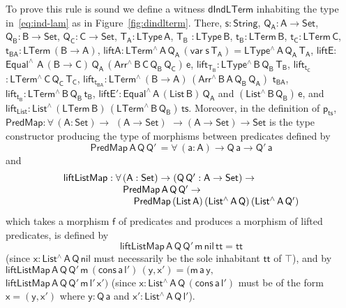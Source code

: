 \documentclass[sigplan,10pt,anonymous,review]{acmart}
\begin{document}
To prove this rule is sound we define a witness $\mathsf{dIndLTerm}$
inhabiting the type in~\eqref{eq:ind-lam} as in
Figure~\ref{fig:dindlterm}. There, $\mathsf{s : String}$, $\mathsf{Q_A
  : A \to Set}$, $\mathsf{Q_B : B \to Set}$, $\mathsf{Q_C : C \to
  Set}$, $\mathsf{T_A : LType\,A}$, $\mathsf{T_B}$ $\mathsf{:
  LType\,B}$, $\mathsf{t_B : LTerm\,B}$, $\mathsf{t_C : LTerm\,C}$,
$\mathsf{t_{BA} : LTerm\,(B \to A)}$, $\mathsf{liftA :
  LTerm^{\wedge}\, A\, Q_A\, (var\;s\,T_A) =
  LType^{\wedge}\,A\,Q_A\,T_A}$, $\mathsf{liftE :}$
$\mathsf{Equal^{\wedge}}$ $\mathsf{A\, (B \to C)\, Q_A\, (Arr^{\wedge}
  \, B\, C\, Q_B \, Q_C) \, e}$, $\mathsf{lift_{T_B}: LType^{\wedge}
  \, B\, Q_B\, T_B}$, $\mathsf{lift_{t_C}}$ $\mathsf{: LTerm^{\wedge}
  \, C\, Q_C\, T_C}$, $\mathsf{lift_{t_{BA}}: LTerm^{\wedge} \, (B \to
  A)\, (Arr^{\wedge} \, B\, A\, Q_B \, Q_A)}$ $\mathsf{t_{BA}}$,
$\mathsf{lift_{t_B}: LTerm^{\wedge} \, B\, Q_B\, t_B}$,
$\mathsf{liftE' : Equal^{\wedge}\, A\, (List\,B)\, Q_A}$ and
$\mathsf{(List^{\wedge}\, B\, Q_B)\, e}$, and $\mathsf{lift_{List}:
  List^{\wedge} \, (LTerm\, B) \, (LTerm^{\wedge}\, B\, Q_B) \, ts}$.
Moreover, in the definition of $\mathsf{p_{ts}}$, $\mathsf{PredMap :
  \forall\, (A : Set) \to}$ $\mathsf{(A \to Set)}$ $\mathsf{\to (A \to
  Set) \to Set }$ is the type constructor producing the type of
morphisms between predicates defined by
\[\mathsf{PredMap \,A\, Q\,Q'\,
  = \forall\, (a : A) \to Q\,a \to Q'\,a}\] and
\[\begin{array}{l}
\mathsf{liftListMap : \forall\, (A : Set) \to (Q \, Q' : A \to Set)
  \to}\\\
\hspace*{0.8in}\mathsf{PredMap\,A\,Q\,Q' \to}\\
\hspace*{1in}\mathsf{PredMap\,(List\,A)
  \,(List^{\wedge}\, A\, Q)\, (List^{\wedge}\, A\, Q')}
\end{array}\]
which takes a morphism $\mathsf{f}$ of predicates and produces a
morphism of lifted predicates, is defined by
\[\mathsf{liftListMap\, A\, Q\, Q'\, m\, nil\, tt = tt}\]
(since $\mathsf{x : List^{\wedge}\,
  A\, Q\, nil}$ must necessarily be the sole inhabitant $\mathsf{tt}$
of $\mathsf{\top}$), and by $\mathsf{liftListMap\, A\, Q\, Q'\, m\,
  (cons\, a\, l')\, (y, x') = (m\,a\,y,}$\\ $\mathsf{liftListMap\, A\,
  Q\, Q'\, m\, l'\, x')}$ (since $\mathsf{x : List^{\wedge}\, A\,
  Q\, (cons\, a\, l')}$ must be of the form $\mathsf{x = (y, x')}$
where $\mathsf{y : Q\,a}$ and $\mathsf{x' : List^{\wedge}\, A\, Q\,
  l'}$).
\end{document}
